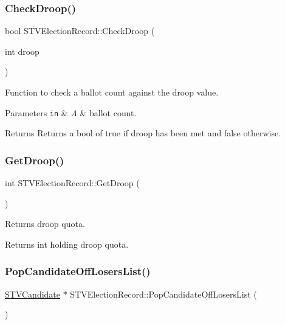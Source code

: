 \subsubsection{\texorpdfstring{Check\+Droop()}{CheckDroop()}}
{\footnotesize\ttfamily bool S\+T\+V\+Election\+Record\+::\+Check\+Droop (\begin{DoxyParamCaption}\item[{int}]{droop }\end{DoxyParamCaption})}



Function to check a ballot count against the droop value. 


\begin{DoxyParams}[1]{Parameters}
\mbox{\tt in}  & {\em A} & ballot count.\\
\hline
\end{DoxyParams}
\begin{DoxyReturn}{Returns}
Returns a bool of true if droop has been met and false otherwise. 
\end{DoxyReturn}
\mbox{\label{classSTVElectionRecord_aa954f6081a250962261e63a7497c1eb4}} 
\subsubsection{\texorpdfstring{Get\+Droop()}{GetDroop()}}
{\footnotesize\ttfamily int S\+T\+V\+Election\+Record\+::\+Get\+Droop (\begin{DoxyParamCaption}{ }\end{DoxyParamCaption})}



Returns droop quota. 

\begin{DoxyReturn}{Returns}
int holding droop quota. 
\end{DoxyReturn}
\mbox{\label{classSTVElectionRecord_ae7078fcee0d4b897d1536bee9ac342f6}} 
\subsubsection{\texorpdfstring{Pop\+Candidate\+Off\+Losers\+List()}{PopCandidateOffLosersList()}}
{\footnotesize\ttfamily \hyperlink{classSTVCandidate}{S\+T\+V\+Candidate} $\ast$ S\+T\+V\+Election\+Record\+::\+Pop\+Candidate\+Off\+Losers\+List (\begin{DoxyParamCaption}{ }\end{DoxyParamCaption})}



